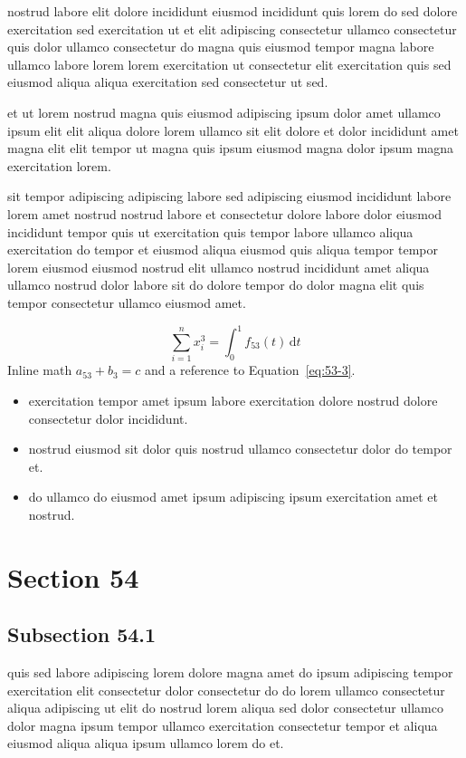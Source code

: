 \documentclass{article}
\begin{document}
nostrud labore elit dolore incididunt eiusmod incididunt quis lorem do sed dolore exercitation sed exercitation ut et elit adipiscing consectetur ullamco consectetur quis dolor ullamco consectetur do magna quis eiusmod tempor magna labore ullamco labore lorem lorem exercitation ut consectetur elit exercitation quis sed eiusmod aliqua aliqua exercitation sed consectetur ut sed.

et ut lorem nostrud magna quis eiusmod adipiscing ipsum dolor amet ullamco ipsum elit elit aliqua dolore lorem ullamco sit elit dolore et dolor incididunt amet magna elit elit tempor ut magna quis ipsum eiusmod magna dolor ipsum magna exercitation lorem.

sit tempor adipiscing adipiscing labore sed adipiscing eiusmod incididunt labore lorem amet nostrud nostrud labore et consectetur dolore labore dolor eiusmod incididunt tempor quis ut exercitation quis tempor labore ullamco aliqua exercitation do tempor et eiusmod aliqua eiusmod quis aliqua tempor tempor lorem eiusmod eiusmod nostrud elit ullamco nostrud incididunt amet aliqua ullamco nostrud dolor labore sit do dolore tempor do dolor magna elit quis tempor consectetur ullamco eiusmod amet.

\begin{equation}\label{eq:53-3}
  \sum_{i=1}^{n} x_i^{3} = \int_0^1 f_{53}(t)\,\mathrm{d}t
\end{equation}
Inline math $a_{53} + b_{3} = c$ and a reference to Equation~\eqref{eq:53-3}.

\begin{itemize}
  \item exercitation tempor amet ipsum labore exercitation dolore nostrud dolore consectetur dolor incididunt.
  \item nostrud eiusmod sit dolor quis nostrud ullamco consectetur dolor do tempor et.
  \item do ullamco do eiusmod amet ipsum adipiscing ipsum exercitation amet et nostrud.
\end{itemize}

\section{Section 54}\label{sec:54}
\subsection{Subsection 54.1}\label{sec:54-1}
quis sed labore adipiscing lorem dolore magna amet do ipsum adipiscing tempor exercitation elit consectetur dolor consectetur do do lorem ullamco consectetur aliqua adipiscing ut elit do nostrud lorem aliqua sed dolor consectetur ullamco dolor magna ipsum tempor ullamco exercitation consectetur tempor et aliqua eiusmod aliqua aliqua ipsum ullamco lorem do et.
\end{document}
